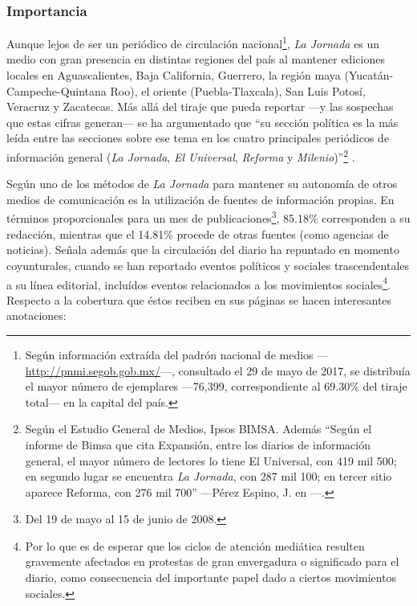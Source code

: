 \documentclass[letterpaper, 11pt]{book}
\theoremstyle{definition}
\theoremstyle{remark}
\begin{document}
\subsubsection{Importancia}
\label{sec:LaJornadaDiario_Importancia}

Aunque lejos de ser un periódico de circulación nacional\footnote{Según información extraída del padrón nacional de medios ---\url{http://pnmi.segob.gob.mx/}---, consultado el 29 de mayo de 2017, se distribuía el mayor número de ejemplares ---76,399, correspondiente al 69.30\% del tiraje total--- en la capital del país.}, \emph{La Jornada} es un medio con gran presencia en distintas regiones del país al mantener ediciones locales en Aguascalientes, Baja California, Guerrero, la región maya (Yucatán-Campeche-Quintana Roo), el oriente (Puebla-Tlaxcala), San Luis Potosí, Veracruz y Zacatecas. 
Más allá del tiraje que pueda reportar ---y las sospechas que estas cifras generan--- se ha argumentado que ``su sección política es la más leída entre las secciones sobre ese tema en los cuatro principales periódicos de información general (\emph{La Jornada}, \emph{El Universal}, \emph{Reforma} y \emph{Milenio})''\footnote{Según el Estudio General de
Medios, Ipsos BIMSA. Además ``Según el informe de Bimsa que cita Expansión, entre los diarios de información
general, el mayor número de lectores lo tiene El Universal, con 419 mil 500; en
segundo lugar se encuentra \emph{La Jornada}, con 287 mil 100; en tercer sitio
aparece Reforma, con 276 mil 700'' ---Pérez Espino, J. en \citep[245]{2011_Tesis_LaJornada}---.} \normalsize \citep[34]{2011_Tesis_LaJornada}.


Según \citet{2011_Tesis_LaJornada} uno de los métodos de \emph{La Jornada} para mantener su autonomía de otros medios de comunicación es la utilización de fuentes de información propias. 
En términos proporcionales para un mes de publicaciones\footnote{Del 19 de mayo al 15 de junio de 2008.},  85.18\% corresponden a su redacción, mientras que el 14.81\% procede de otras fuentes (como agencias de noticias). 
Señala además que la circulación del diario ha repuntado en momento coyunturales, cuando se han reportado eventos políticos y sociales trascendentales a su línea editorial, incluídos eventos relacionados a los movimientos sociales\footnote{Por lo que es de esperar que los ciclos de atención mediática resulten gravemente afectados en protestas de gran envergadura o significado para el diario, como consecuencia del importante papel dado a ciertos movimientos sociales.}. 
Respecto a la cobertura que éstos reciben en sus páginas se hacen interesantes anotaciones:
\end{document}
